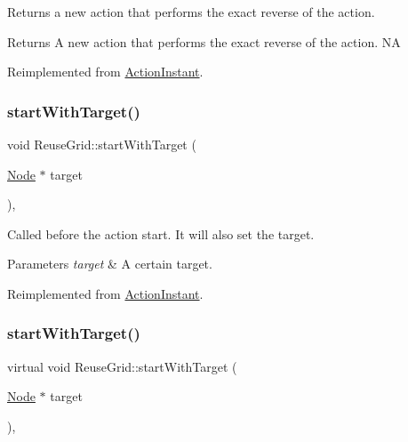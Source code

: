 Returns a new action that performs the exact reverse of the action.

\begin{DoxyReturn}{Returns}
A new action that performs the exact reverse of the action.  NA 
\end{DoxyReturn}


Reimplemented from \hyperlink{classActionInstant_aeb1870802c509e1f4111c863a28e9262}{Action\+Instant}.

\mbox{\label{classReuseGrid_abf42c6057c8691102243dddcce1d749f}} 
\subsubsection{\texorpdfstring{start\+With\+Target()}{startWithTarget()}\hspace{0.1cm}{\footnotesize\ttfamily [1/2]}}
{\footnotesize\ttfamily void Reuse\+Grid\+::start\+With\+Target (\begin{DoxyParamCaption}\item[{\hyperlink{classNode}{Node} $\ast$}]{target }\end{DoxyParamCaption})\hspace{0.3cm}{\ttfamily [override]}, {\ttfamily [virtual]}}

Called before the action start. It will also set the target.


\begin{DoxyParams}{Parameters}
{\em target} & A certain target. \\
\hline
\end{DoxyParams}


Reimplemented from \hyperlink{classActionInstant_a47cff49ef73e126e5e9d6c26872a9e23}{Action\+Instant}.

\mbox{\label{classReuseGrid_a7d81825e327a71fa4473f47aa4186f3b}} 
\subsubsection{\texorpdfstring{start\+With\+Target()}{startWithTarget()}\hspace{0.1cm}{\footnotesize\ttfamily [2/2]}}
{\footnotesize\ttfamily virtual void Reuse\+Grid\+::start\+With\+Target (\begin{DoxyParamCaption}\item[{\hyperlink{classNode}{Node} $\ast$}]{target }\end{DoxyParamCaption})\hspace{0.3cm}{\ttfamily [override]}, {\ttfamily [virtual]}}

